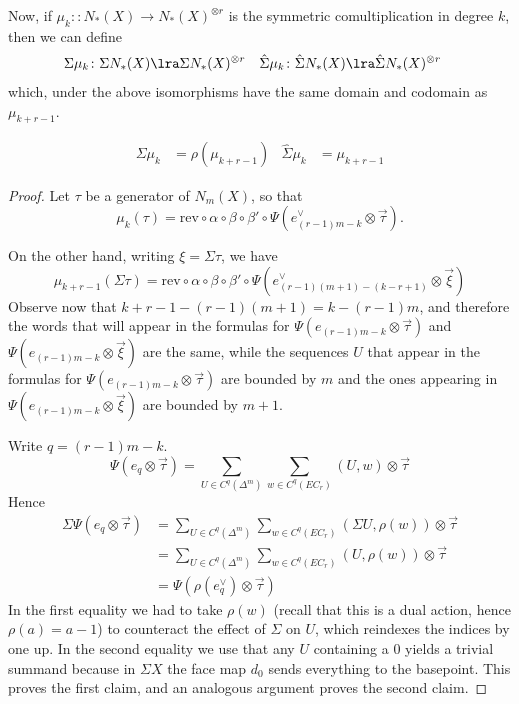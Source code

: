 Now, if $\mu_{k}\colon \colon N_*(X)\to N_*(X)^{\otimes r}$ is the symmetric comultiplication in degree $k$, then we can define
\begin{align*}
    \Sigma \mu_k\colon \Sigma N_*(X)&\lra \Sigma N_*(X)^{\otimes r} 
    &
    \hat{\Sigma} \mu_k\colon \hat{\Sigma} N_*(X)&\lra \hat{\Sigma} N_*(X)^{\otimes r}
\end{align*}
which, under the above isomorphisms have the same domain and codomain as $\mu_{k+r-1}$.
\begin{proposition}
    \begin{align*}
        \Sigma \mu_k &= \rho(\mu_{k+r-1}) &
        \hat{\Sigma} \mu_k &= \mu_{k+r-1}
    \end{align*}
\end{proposition}
\begin{proof}
    Let $\tau$ be a generator of $N_m(X)$, so that \[\mu_k(\tau) = \mathrm{rev}\circ \alpha\circ\beta\circ\beta'\circ \Psi(e_{(r-1)m-k}^\vee\otimes \vec{\tau}).\]
    
    On the other hand, writing $\xi = \Sigma \tau$, we have 
    \[\mu_{k+r-1}(\Sigma \tau) = \mathrm{rev}\circ \alpha\circ\beta\circ\beta'\circ \Psi(e_{(r-1)(m+1)-(k-r+1)}^\vee\otimes \vec{\xi})\]
     Observe now that $k+r-1-(r-1)(m+1) = k-(r-1)m$, and therefore the words that will appear in the formulas for $\Psi(e_{(r-1)m-k}\otimes \vec{\tau})$ and $\Psi(e_{(r-1)m-k}\otimes \vec{\xi})$ are the same, while the sequences $U$ that appear in the formulas for $\Psi(e_{(r-1)m-k}\otimes \vec{\tau})$ are bounded by $m$ and the ones appearing in $\Psi(e_{(r-1)m-k}\otimes \vec{\xi})$ are bounded by $m+1$.
     
     Write $q = (r-1)m-k$.
     \[\Psi(e_{q}\otimes \vec{\tau}) = \sum_{U\in C^{q}(\Delta^m)}\sum_{w\in C^q(EC_r)} (U,w)\otimes \vec{\tau} \]
     Hence
     \begin{align*}
         \Sigma\Psi(e_{q}\otimes \vec{\tau}) 
         &= \sum_{U\in C^{q}(\Delta^m)}\sum_{w\in C^q(EC_r)} (\Sigma U,\rho(w))\otimes \vec{\tau} \\
         &= \sum_{U\in C^{q}(\Delta^m)}\sum_{w\in C^q(EC_r)} (U,\rho(w))\otimes \vec{\tau} \\
         &= \Psi(\rho(e_q^\vee)\otimes \vec{\tau})
    \end{align*}
    In the first equality we had to take $\rho(w)$ (recall that this is a dual action, hence $\rho(a) = a-1$) to counteract the effect of $\Sigma$ on $U$, which reindexes the indices by one up. In the second equality we use that any $U$ containing a $0$ yields a trivial summand because in $\Sigma X$ the face map $d_0$ sends everything to the basepoint. This proves the first claim, and an analogous argument proves the second claim. 
\end{proof}
